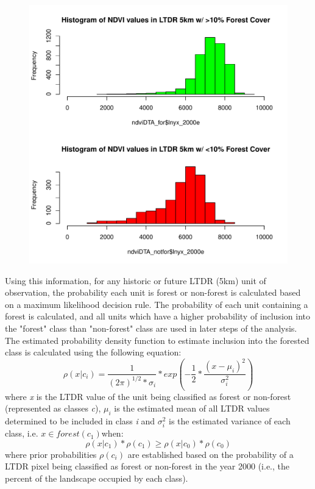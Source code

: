 \documentclass{article}\usepackage[]{graphicx}\usepackage[]{color}
\newenvironment{knitrout}{}{}  %
\begin{document}
\begin{knitrout}
\begin{figure}[H]
\begin{Schunk}
\includegraphics[width=0.8\linewidth]{figure/LTDR_NDVI_hist-1} \end{Schunk}
\end{figure}
\par
Using this information, for any historic or future LTDR (5km) unit of observation, the probability each unit is forest or non-forest is calculated based on a maximum likelihood decision rule.
The probability of each unit containing a forest is calculated, and all units which have a higher probability of inclusion into the "forest" class than "non-forest" class are used in later steps of the analysis.
The estimated probability density function to estimate inclusion into the forested class is calculated using the following equation:
\begin{equation}
\rho (x | c_{i}) = \frac{1}{(2\pi)^{1/2}*\sigma_{i}} * exp(-\frac{1}{2}*\frac{(x-\mu_{i})^{2}}{\sigma_{i}^{2}})
\end{equation}
where \textit{x} is the LTDR value of the unit being classified as forest or non-forest (represented as classes \textit{c}), \begin{math}\mu_{i}\end{math} is the estimated mean of all LTDR values determined to be included in class \textit{i} and \begin{math}\sigma_{i}^{2}\end{math} is the estimated variance of each class, i.e. \begin{math}x \in forest (c_{1}) \end{math}when:
\begin{equation}
\rho (x | c_{1}) * \rho(c_{1}) \geq \rho (x | c_{0}) * \rho(c_{0})
\end{equation}
where prior probabilities \begin{math} \rho(c_{i})\end{math} are established based on the probability of a LTDR pixel being classified as forest or non-forest in the year 2000 (i.e., the percent of the landscape occupied by each class).
\par


\end{knitrout}
\end{document}
